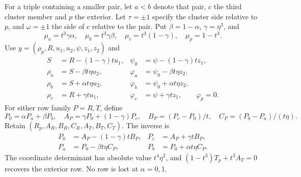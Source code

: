 \documentclass[11pt,a4paper]{article}
\numberwithin{equation}{section}
\theoremstyle{remark}
\begin{document}
For a triple containing a smaller pair, let $a<b$ denote that pair, $c$ the third cluster member and $p$ the exterior. Let $\tau=\pm1$ specify the cluster side relative to $p$, and $\omega=\pm1$ the side of $c$ relative to the pair. Put $\beta=1-\alpha$, $\gamma=\eta^3$, and
\begin{equation}\label{eq:nest-masses}
 \mu_a=t^3\gamma\alpha,\quad\mu_b=t^3\gamma\beta,\quad
 \mu_c=t^3(1-\gamma),\quad\mu_p=1-t^3.
\end{equation}
Use $y=(\rho_p,R,u_1,u_2,\psi,z_1,z_2)$ and
\begin{equation}\label{eq:nest-coordinates}
 \begin{aligned}
 S&=R-(1-\gamma)tu_1,&\psi_0&=\psi-(1-\gamma)tz_1,\\
 \rho_a&=S-\beta t\eta u_2,&\varphi_a&=\psi_0-\beta t\eta z_2,\\
 \rho_b&=S+\alpha t\eta u_2,&\varphi_b&=\psi_0+\alpha t\eta z_2,\\
 \rho_c&=R+\gamma tu_1,&\varphi_c&=\psi+\gamma tz_1,\qquad\varphi_p=0.
 \end{aligned}
\end{equation}
For either row family $P=R,T$, define
\begin{equation}\label{eq:nest-rows}
 P_0=\alpha P_a+\beta P_b,\quad
 A_P=\gamma P_0+(1-\gamma)P_c,\quad
 B_P=(P_c-P_0)/t,\quad C_P=(P_b-P_a)/(t\eta).
\end{equation}
Retain $(R_p,A_R,B_R,C_R,A_T,B_T,C_T)$. The inverse is
\begin{equation}\label{eq:nest-recovery}
 \begin{aligned}
 P_0&=A_P-(1-\gamma)tB_P,&P_c&=A_P+\gamma tB_P,\\
 P_a&=P_0-\beta t\eta C_P,&P_b&=P_0+\alpha t\eta C_P.
 \end{aligned}
\end{equation}
The coordinate determinant has absolute value $t^4\eta^2$, and $(1-t^3)T_p+t^3A_T=0$ recovers the exterior row. No row is lost at $\alpha=0,1$.
\end{document}
